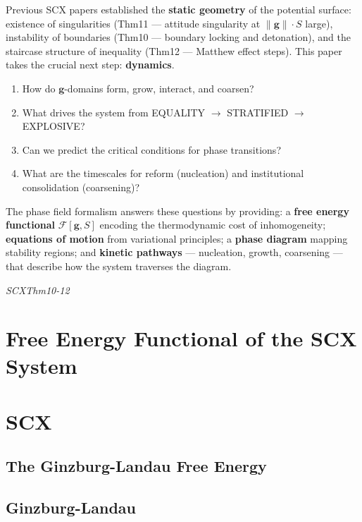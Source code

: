 \documentclass[12pt,a4paper]{article}
\theoremstyle{plain}
\theoremstyle{definition}
\newcommand{\cF}{\mathcal{F}}
\newcommand{\gf}{\mathbf{g}}          %
\newcommand{\Sf}{S}                   %
\newcommand{\cn}[1]{\textcolor{scxgray}{\textit{#1}}}
\begin{document}
Previous SCX papers established the \textbf{static geometry} of the potential
surface: existence of singularities (Thm11 — attitude singularity at
$\|\gf\|\cdot\Sf$ large), instability of boundaries (Thm10 — boundary locking
and detonation), and the staircase structure of inequality (Thm12 — Matthew
effect steps). This paper takes the crucial next step: \textbf{dynamics}.

\begin{enumerate}[label=(\arabic*)]
    \item How do $\gf$-domains form, grow, interact, and coarsen?
    \item What drives the system from EQUALITY $\to$ STRATIFIED $\to$ EXPLOSIVE?
    \item Can we predict the critical conditions for phase transitions?
    \item What are the timescales for reform (nucleation) and institutional
          consolidation (coarsening)?
\end{enumerate}

The phase field formalism answers these questions by providing: a
\textbf{free energy functional} $\cF[\gf,\Sf]$ encoding the thermodynamic
cost of inhomogeneity; \textbf{equations of motion} from variational
principles; a \textbf{phase diagram} mapping stability regions; and
\textbf{kinetic pathways} — nucleation, growth, coarsening — that describe
how the system traverses the diagram.

\bigskip
\noindent
\cn{SCXThm10-12}

\section{Free Energy Functional of the SCX System}
\section*{SCX}

\subsection{The Ginzburg-Landau Free Energy}
\subsection*{Ginzburg-Landau}
\end{document}

